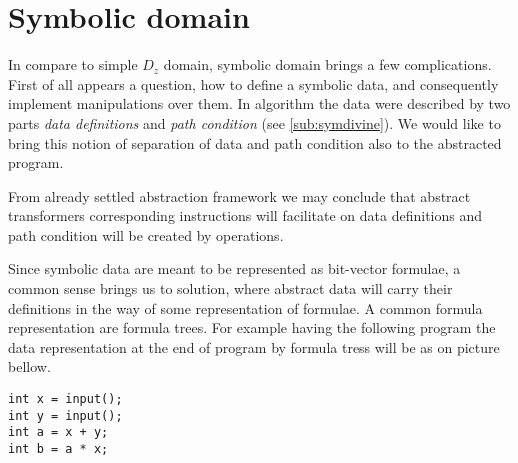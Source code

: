 \section{Symbolic domain}\label{sec:sym}

In compare to simple $D_z$ domain, symbolic domain brings a few complications.
First of all appears a question, how to define a symbolic data, and consequently
implement manipulations over them. In \SymDIVINE algorithm the data were
described by two parts \emph{data definitions} and \emph{path condition} (see
\autoref{sub:symdivine}). We would like to bring this notion of separation of data
and path condition also to the abstracted program.

From already settled abstraction framework we may conclude that abstract
transformers corresponding \LLVM instructions will facilitate on data
definitions and path condition will be created by  operations.

Since symbolic data are meant to be represented as bit-vector formulae,
a common sense brings us to solution, where abstract data will carry their
definitions in the way of some representation of formulae. A common formula
representation are formula trees. For example having the following program the
data representation at the end of program by formula tress will be as on picture bellow.
\begin{verbatim}
int x = input();
int y = input();
int a = x + y;
int b = a * x;
\end{verbatim}

\begin{center}
\begin{minipage}{.4\textwidth}
\end{minipage}
\begin{minipage}{.4\textwidth}
\end{minipage}
\end{center}

